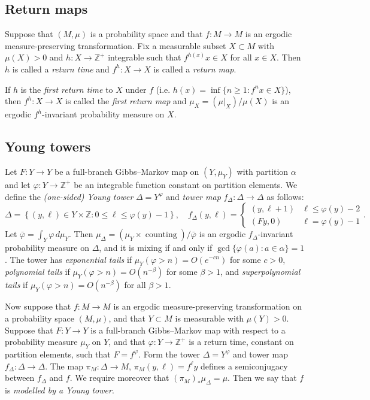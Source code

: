 \documentclass[10pt]{amsart}
\theoremstyle{definition}\newtheorem{defi}[theo]{Definition}\newtheorem{rema}[theo]{Remark}\newtheorem{exam}[theo]{Example}\newtheorem{exem}[theo]{Example}\newtheorem{nota}[theo]{Notation}
\newcommand{\Z}{\mathbb{Z}}
\DeclareMathOperator{\counting}{counting}
\newcommand{\bvarphi}{\bar{\varphi}}
\begin{document}
\subsection{Return maps}
Suppose that $(M,\mu)$ is a probability space and that $f:M\to M$ is an ergodic measure-preserving transformation. Fix a measurable subset $X\subset M$ with $\mu(X)>0$ and $h:X\to\Z^+$ integrable such that $f^{h(x)}x\in X$ for all $x\in X$. Then $h$ is called a \emph{return time} and $f^h:X\to X$ is called a \emph{return map}.

If $h$ is the \emph{first return time} to $X$ under $f$ (i.e. $h(x)=\inf\{n\ge1:f^nx\in X\}$), then $f^h:X\to X$ is called the {\em first return map} and $\mu_X=(\mu|_X)/\mu(X)$ is an ergodic $f^h$-invariant probability measure on $X$.


\subsection{Young towers}

Let $F:Y\to Y$ be a full-branch Gibbs--Markov map on $(Y,\mu_Y)$ with partition $\alpha$ and let $\varphi:Y\to\Z^+$ be an integrable function constant on partition elements. We define the \emph{(one-sided) Young tower} $\Delta=Y^\varphi$ and \emph{tower map} $f_\Delta:\Delta\to\Delta$ as follows:
\[
\Delta=\left\{(y,\ell)\in Y\times\Z: 0\le \ell\le \varphi(y)-1\right\},
\quad f_\Delta(y,\ell)=
\begin{cases}
(y,\ell+1) & \ell\le\varphi(y)-2 \\
(Fy,0) & \ell=\varphi(y)-1
\end{cases}.
\]
Let $\bvarphi=\int_Y\varphi\,d\mu_Y$. Then $\mu_\Delta=(\mu_Y\times\counting)/\bvarphi$ is an ergodic $f_\Delta$-invariant probability measure on $\Delta$, and it is mixing if and only if $\gcd\{\varphi(a):a\in\alpha\}=1$. The tower has \emph{exponential tails} if $\mu_Y(\varphi>n)=O(e^{-cn})$ for some $c>0$, \emph{polynomial tails} if $\mu_Y(\varphi>n)=O(n^{-\beta})$ for some $\beta>1$, and \emph{superpolynomial tails} if $\mu_Y(\varphi>n)=O(n^{-\beta})$ for all $\beta>1$.

Now suppose that $f:M\to M$ is an ergodic measure-preserving transformation on a probability space $(M,\mu)$, and that $Y\subset M$ is measurable with $\mu(Y)>0$. Suppose that $F:Y\to Y$ is a full-branch Gibbs--Markov map with respect to a probability measure $\mu_Y$ on $Y$, and that $\varphi:Y\to \Z^+$ is a return time, constant on partition elements, such that $F=f^\varphi$. Form the tower $\Delta=Y^\varphi$ and tower map $f_\Delta:\Delta\to\Delta$. The map $\pi_M:\Delta\to M$, $\pi_M(y,\ell)=f^\ell y$ defines a semiconjugacy between $f_\Delta$ and $f$. We require moreover that $(\pi_M)_*\mu_\Delta=\mu$. Then we say that $f$ is \emph{modelled by a Young tower}.
\end{document}
